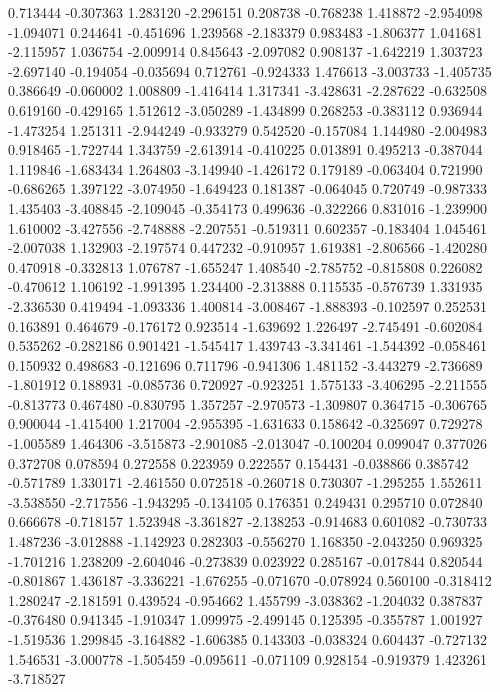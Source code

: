 0.713444
-0.307363
1.283120
-2.296151
0.208738
-0.768238
1.418872
-2.954098
-1.094071
0.244641
-0.451696
1.239568
-2.183379
0.983483
-1.806377
1.041681
-2.115957
1.036754
-2.009914
0.845643
-2.097082
0.908137
-1.642219
1.303723
-2.697140
-0.194054
-0.035694
0.712761
-0.924333
1.476613
-3.003733
-1.405735
0.386649
-0.060002
1.008809
-1.416414
1.317341
-3.428631
-2.287622
-0.632508
0.619160
-0.429165
1.512612
-3.050289
-1.434899
0.268253
-0.383112
0.936944
-1.473254
1.251311
-2.944249
-0.933279
0.542520
-0.157084
1.144980
-2.004983
0.918465
-1.722744
1.343759
-2.613914
-0.410225
0.013891
0.495213
-0.387044
1.119846
-1.683434
1.264803
-3.149940
-1.426172
0.179189
-0.063404
0.721990
-0.686265
1.397122
-3.074950
-1.649423
0.181387
-0.064045
0.720749
-0.987333
1.435403
-3.408845
-2.109045
-0.354173
0.499636
-0.322266
0.831016
-1.239900
1.610002
-3.427556
-2.748888
-2.207551
-0.519311
0.602357
-0.183404
1.045461
-2.007038
1.132903
-2.197574
0.447232
-0.910957
1.619381
-2.806566
-1.420280
0.470918
-0.332813
1.076787
-1.655247
1.408540
-2.785752
-0.815808
0.226082
-0.470612
1.106192
-1.991395
1.234400
-2.313888
0.115535
-0.576739
1.331935
-2.336530
0.419494
-1.093336
1.400814
-3.008467
-1.888393
-0.102597
0.252531
0.163891
0.464679
-0.176172
0.923514
-1.639692
1.226497
-2.745491
-0.602084
0.535262
-0.282186
0.901421
-1.545417
1.439743
-3.341461
-1.544392
-0.058461
0.150932
0.498683
-0.121696
0.711796
-0.941306
1.481152
-3.443279
-2.736689
-1.801912
0.188931
-0.085736
0.720927
-0.923251
1.575133
-3.406295
-2.211555
-0.813773
0.467480
-0.830795
1.357257
-2.970573
-1.309807
0.364715
-0.306765
0.900044
-1.415400
1.217004
-2.955395
-1.631633
0.158642
-0.325697
0.729278
-1.005589
1.464306
-3.515873
-2.901085
-2.013047
-0.100204
0.099047
0.377026
0.372708
0.078594
0.272558
0.223959
0.222557
0.154431
-0.038866
0.385742
-0.571789
1.330171
-2.461550
0.072518
-0.260718
0.730307
-1.295255
1.552611
-3.538550
-2.717556
-1.943295
-0.134105
0.176351
0.249431
0.295710
0.072840
0.666678
-0.718157
1.523948
-3.361827
-2.138253
-0.914683
0.601082
-0.730733
1.487236
-3.012888
-1.142923
0.282303
-0.556270
1.168350
-2.043250
0.969325
-1.701216
1.238209
-2.604046
-0.273839
0.023922
0.285167
-0.017844
0.820544
-0.801867
1.436187
-3.336221
-1.676255
-0.071670
-0.078924
0.560100
-0.318412
1.280247
-2.181591
0.439524
-0.954662
1.455799
-3.038362
-1.204032
0.387837
-0.376480
0.941345
-1.910347
1.099975
-2.499145
0.125395
-0.355787
1.001927
-1.519536
1.299845
-3.164882
-1.606385
0.143303
-0.038324
0.604437
-0.727132
1.546531
-3.000778
-1.505459
-0.095611
-0.071109
0.928154
-0.919379
1.423261
-3.718527
